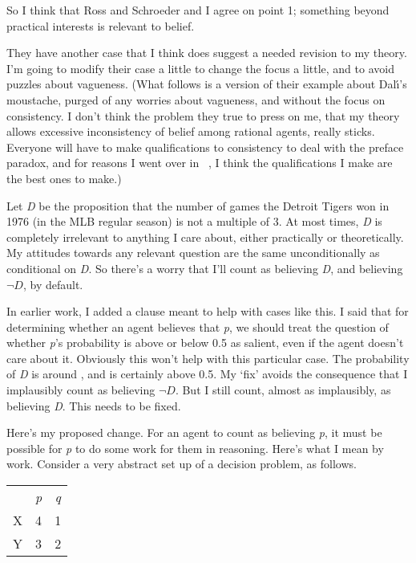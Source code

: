 So I think that Ross and Schroeder and I agree on point 1; something beyond practical interests is relevant to belief.

They have another case that I think does suggest a needed revision to my theory. I'm going to modify their case a little to change the focus a little, and to avoid puzzles about vagueness. (What follows is a version of their example about Dal\'\i's moustache, purged of any worries about vagueness, and without the focus on consistency. I don't think the problem they true to press on me, that my theory allows excessive inconsistency of belief among rational agents, really sticks. Everyone will have to make qualifications to consistency to deal with the preface paradox, and for reasons I went over in ~\citep{Weatherson2005-WEACWD}, I think the qualifications I make are the best ones to make.)

Let \emph{D} be the proposition that the number of games the Detroit Tigers won in 1976 (in the MLB regular season) is not a multiple of 3. At most times, \emph{D} is completely irrelevant to anything I care about, either practically or theoretically. My attitudes towards any relevant question are the same unconditionally as conditional on \emph{D}. So there's a worry that I'll count as believing \emph{D}, and believing $\neg D$, by default.

In earlier work, I added a clause meant to help with cases like this. I said that for determining whether an agent believes that \emph{p}, we should treat the question of whether \emph{p}'s probability is above or below 0.5 as salient, even if the agent doesn't care about it. Obviously this won't help with this particular case. The probability of \emph{D} is around , and is certainly above 0.5. My `fix' avoids the consequence that I implausibly count as believing $\neg D$. But I still count, almost as implausibly, as believing \emph{D}. This needs to be fixed.

Here's my proposed change. For an agent to count as believing \emph{p}, it must be possible for \emph{p} to do some work for them in reasoning. Here's what I mean by work. Consider a very abstract set up of a decision problem, as follows.

\begin{center}
\begin{tabular}{rcc}
&\emph{p}&\emph{q}\\
X&4&1\\
Y&3&2\\
\end{tabular}
\end{center}

